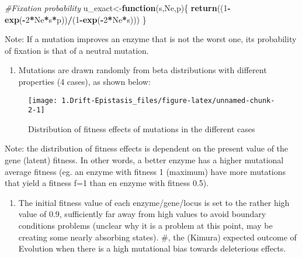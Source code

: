 \documentclass[]{article}
\newenvironment{Shaded}{\begin{snugshade}}{\end{snugshade}}
\newcommand{\CommentTok}[1]{\textcolor[rgb]{0.56,0.35,0.01}{\textit{#1}}}
\newcommand{\ControlFlowTok}[1]{\textcolor[rgb]{0.13,0.29,0.53}{\textbf{#1}}}
\newcommand{\DecValTok}[1]{\textcolor[rgb]{0.00,0.00,0.81}{#1}}
\newcommand{\KeywordTok}[1]{\textcolor[rgb]{0.13,0.29,0.53}{\textbf{#1}}}
\newcommand{\NormalTok}[1]{#1}
\newcommand{\OperatorTok}[1]{\textcolor[rgb]{0.81,0.36,0.00}{\textbf{#1}}}
\providecommand{\tightlist}{%
  \setlength{\itemsep}{0pt}\setlength{\parskip}{0pt}}
\begin{document}
\begin{Shaded}
\begin{Highlighting}[]
\CommentTok{#Fixation probability}
\NormalTok{u_exact<-}\ControlFlowTok{function}\NormalTok{(s,Ne,p)\{}
  \KeywordTok{return}\NormalTok{((}\DecValTok{1}\OperatorTok{-}\KeywordTok{exp}\NormalTok{(}\OperatorTok{-}\DecValTok{2}\OperatorTok{*}\NormalTok{Ne}\OperatorTok{*}\NormalTok{s}\OperatorTok{*}\NormalTok{p))}\OperatorTok{/}\NormalTok{(}\DecValTok{1}\OperatorTok{-}\KeywordTok{exp}\NormalTok{(}\OperatorTok{-}\DecValTok{2}\OperatorTok{*}\NormalTok{Ne}\OperatorTok{*}\NormalTok{s)))}
\NormalTok{\}}
\end{Highlighting}
\end{Shaded}

Note: If a mutation improves an enzyme that is not the worst one, its
probability of fixation is that of a neutral mutation.

\begin{enumerate}
\def\labelenumi{\arabic{enumi})}
\setcounter{enumi}{2}
\tightlist
\item
  Mutations are drawn randomly from beta distributions with different
  properties (4 cases), as shown below:
\end{enumerate}

\begin{figure}

{\centering \texttt{[image: 1.Drift-Epistasis\_files/figure-latex/unnamed-chunk-2-1]} 

}

\caption{Distribution of fitness effects of mutations in the different cases}\label{fig:unnamed-chunk-2}
\end{figure}

Note: the distribution of fitness effects is dependent on the present
value of the gene (latent) fitness. In other words, a better enzyme has
a higher mutational average fitness (eg. an enzyme with fitness 1
(maximum) have more mutations that yield a fitness f=1 than en enzyme
with fitness 0.5).

\begin{enumerate}
\def\labelenumi{\arabic{enumi})}
\setcounter{enumi}{3}
\tightlist
\item
  The initial fitness value of each enzyme/gene/locus is set to the
  rather high value of \(0.9\), sufficiently far away from high values
  to avoid boundary conditions problems (unclear why it is a problem at
  this point, may be creating some nearly absorbing states). \#, the
  (Kimura) expected outcome of Evolution when there is a high mutational
  bias towards deleterious effects.
\end{enumerate}
\end{document}
